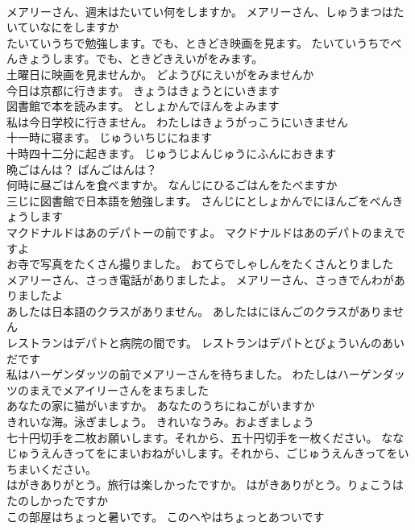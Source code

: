 \documentclass[8pt]{extreport}
\begin{document}
\begin{CJK}{UTF8}{min}
\\	メアリーさん、週末はたいてい何をしますか。	メアリーさん、しゅうまつはたいていなにをしますか 
\\	たいていうちで勉強します。でも、ときどき映画を見ます。	たいていうちでべんきょうします。でも、ときどきえいがをみます。 
\\	土曜日に映画を見ませんか。	どようびにえいがをみませんか 
\\	今日は京都に行きます。	きょうはきょうとにいきます 
\\	図書館で本を読みます。	としょかんでほんをよみます 
\\	私は今日学校に行きません。	わたしはきょうがっこうにいきません 
\\	十一時に寝ます。	じゅういちじにねます 
\\	十時四十二分に起きます。	じゅうじよんじゅうにふんにおきます 
\\	晩ごはんは？	ばんごはんは？ 
\\	何時に昼ごはんを食べますか。	なんじにひるごはんをたべますか 
\\	三じに図書館で日本語を勉強します。	さんじにとしょかんでにほんごをべんきょうします 
\\	マクドナルドはあのデパトーの前ですよ。	マクドナルドはあのデパトのまえですよ 
\\	お寺で写真をたくさん撮りました。	おてらでしゃしんをたくさんとりました 
\\	メアリーさん、さっき電話がありましたよ。	メアリーさん、さっきでんわがありましたよ 
\\	あしたは日本語のクラスがありません。	あしたはにほんごのクラスがありません 
\\	レストランはデパトと病院の間です。	レストランはデパトとびょういんのあいだです 
\\	私はハーゲンダッツの前でメアリーさんを待ちました。	わたしはハーゲンダッツのまえでメアイリーさんをまちました 
\\	あなたの家に猫がいますか。	あなたのうちにねこがいますか 
\\	きれいな海。泳ぎましょう。	きれいなうみ。およぎましょう 
\\	七十円切手を二枚お願いします。それから、五十円切手を一枚ください。	ななじゅうえんきってをにまいおねがいします。それから、ごじゅうえんきってをいちまいください。 
\\	はがきありがとう。旅行は楽しかったですか。	はがきありがとう。りょこうはたのしかったですか 
\\	この部屋はちょっと暑いです。	このへやはちょっとあついです 

\end{CJK}
\end{document}

